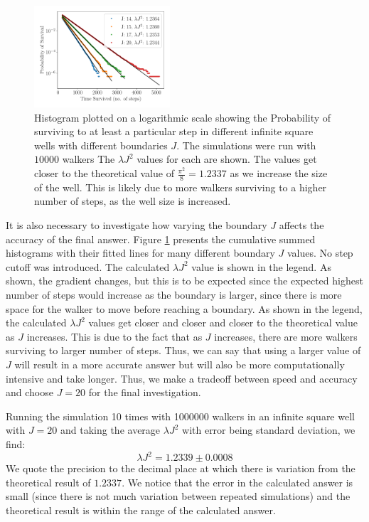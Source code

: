 \documentclass[journal]{IEEEtran}
\begin{document}
\begin{figure}[!ht]
  \begin{center}
    \includegraphics[width=0.45\textwidth]{images/multiplot.pdf}
    \caption{Histogram plotted on a logarithmic scale showing the Probability of
      surviving to at least a particular step in different infinite square wells
      with different boundaries $J$. The simulations were run with $10000$
      walkers The $\lambda J^2$ values for each are shown. The values get closer
      to the theoretical value of $\frac{\pi^2}{8} = 1.2337$ as we increase the
      size of the well. This is likely due to more walkers surviving to a higher
      number of steps, as the well size is increased.}
    \label{fig:multi_line_plot}
  \end{center}
\end{figure}

It is also necessary to investigate how varying the boundary $J$ affects the
accuracy of the final answer. Figure \ref{fig:multi_line_plot} presents the
cumulative summed histograms with their fitted lines for many different boundary
$J$ values. No step cutoff was introduced. The calculated $\lambda J^2$ value is
shown in the legend. As shown, the gradient changes, but this is to be expected
since the expected highest number of steps would increase as the boundary is
larger, since there is more space for the walker to move before reaching a
boundary. As shown in the legend, the calculated $\lambda J^2$ values get closer
and closer and closer to the theoretical value as $J$ increases. This is due to
the fact that as $J$ increases, there are more walkers surviving to larger
number of steps. Thus, we can say that using a larger value of $J$ will result
in a more accurate answer but will also be more computationally intensive and
take longer. Thus, we make a tradeoff between speed and accuracy and choose
$J=20$ for the final investigation.

Running the simulation 10 times with 1000000 walkers in an infinite square well
with $J=20$ and taking the average $\lambda J^2$ with error being standard
deviation, we find:
\begin{equation}
  \lambda J^2 = 1.2339 \pm 0.0008
  \nonumber
\end{equation}
We quote the precision to the decimal place at which there is variation from the
theoretical result of $1.2337$. We notice that the error in the calculated
answer is small (since there is not much variation between repeated simulations)
and the theoretical result is within the range of the calculated answer.
\end{document}
